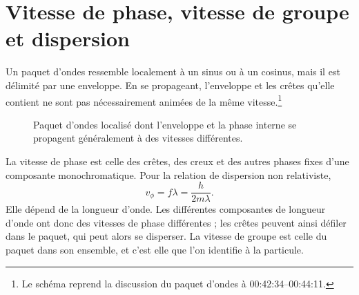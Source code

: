 \section{Vitesse de phase, vitesse de groupe et dispersion}

\begin{classroomqa}
\end{classroomqa}

Un paquet d’ondes ressemble localement à un sinus ou à un cosinus, mais il est délimité par une enveloppe. En se propageant, l’enveloppe et les crêtes qu’elle contient ne sont pas nécessairement animées de la même vitesse.\footnote{Le schéma reprend la discussion du paquet d’ondes à 00:42:34--00:44:11.}

\begin{figure}[t]
\centering
{}
\caption{Paquet d’ondes localisé dont l’enveloppe et la phase interne se propagent généralement à des vitesses différentes.}
\end{figure}

La vitesse de phase est celle des crêtes, des creux et des autres phases fixes d’une composante monochromatique. Pour la relation de dispersion non relativiste,
\begin{equation}
v_\phi=f\lambda=\frac{h}{2m\lambda}.
\end{equation}
Elle dépend de la longueur d’onde. Les différentes composantes de longueur d’onde ont donc des vitesses de phase différentes ; les crêtes peuvent ainsi défiler dans le paquet, qui peut alors se disperser. La vitesse de groupe est celle du paquet dans son ensemble, et c’est elle que l’on identifie à la particule.


